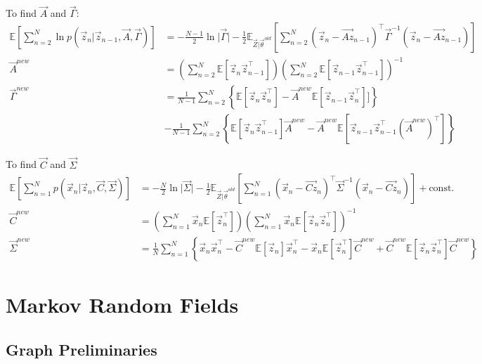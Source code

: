 \documentclass[12pt,twoside]{article}
\begin{document}
To find $\vec{A}$ and $\vec{\Gamma}$:
\begin{align*}
	 \mathbb{E}\left[\sum_{n=2}^N \ln p(\vec{z}_n \vert \vec{z}_{n-1}, \vec{A}, \vec{\Gamma})\right]
	 & = -\frac{N-1}{2}\ln \vert \vec{\Gamma} \vert -\frac{1}{2}\mathbb{E}_{\vec{Z}\vert \vec{\theta}^{old}} \left[\sum_{n=2}^N (\vec{z}_n - \vec{Az}_{n-1})^\top \vec{\Gamma}^{-1}(\vec{z}_n - \vec{Az}_{n-1})\right]\\
	 \vec{A}^{new}				& = \left(\sum_{n=2}^N \mathbb{E}[\vec{z}_n\vec{z}_{n-1}^\top]\right)\left(\sum_{n=2}^N\mathbb{E}[\vec{z}_{n-1}\vec{z}_{n-1}^\top]\right)^{-1}\\
	 \vec{\Gamma}^{new}	& = \frac{1}{N-1}\sum_{n=2}^N \left\lbrace \mathbb{E}[\vec{z}_n\vec{z}_n^\top] - \vec{A}^{new} \mathbb{E}[\vec{z}_{n-1}\vec{z}_n^\top]]\right\rbrace\\
	 &-\frac{1}{N-1}\sum_{n=2}^N \left\lbrace\mathbb{E}[\vec{z}_n\vec{z}_{n-1}^\top]\vec{A}^{new} - \vec{A}^{new}\mathbb{E}[\vec{z}_{n-1}\vec{z}_{n-1}^\top (\vec{A}^{new})^\top]\right\rbrace
\end{align*}

To find $\vec{C}$ and $\vec{\Sigma}$
\begin{align*}
	\mathbb{E}\left[\sum_{n=1}^N p(\vec{x}_n \vert \vec{z}_n, \vec{C}, \vec{\Sigma}) \right]& = -\frac{N}{2} \ln \vert \vec{\Sigma}\vert - \frac{1}{2}\mathbb{E}_{\vec{Z}\vert \vec{\theta}^{old}}\left[\sum_{n=1}^N(\vec{x}_n - \vec{Cz}_n)^\top\vec{\Sigma}^{-1}(\vec{x}_n - \vec{Cz}_n)\right] + \text{const.}\\
	\vec{C}^{new}			& = \left(\sum_{n=1}^N \vec{x}_n \mathbb{E}[\vec{z}_n^\top]\right)\left(\sum_{n=1}^N \vec{x}_n \mathbb{E}[\vec{z}_n\vec{z}_n^\top]\right)^{-1}\\
	\vec{\Sigma}^{new}	& = \frac{1}{N}\sum_{n=1}^N \left\lbrace \vec{x}_n\vec{x}_n^\top - \vec{C}^{new}\mathbb{E}[\vec{z}_n]\vec{x}_n^\top - \vec{x}_n\mathbb{E}[\vec{z}_n^\top]\vec{C}^{new}+\vec{C}^{new}\mathbb{E}[\vec{z}_n\vec{z}_n^\top]\vec{C}^{new} \right\rbrace
\end{align*}


\newpage

\section{Markov Random Fields}

\subsection{Graph Preliminaries}
\end{document}
